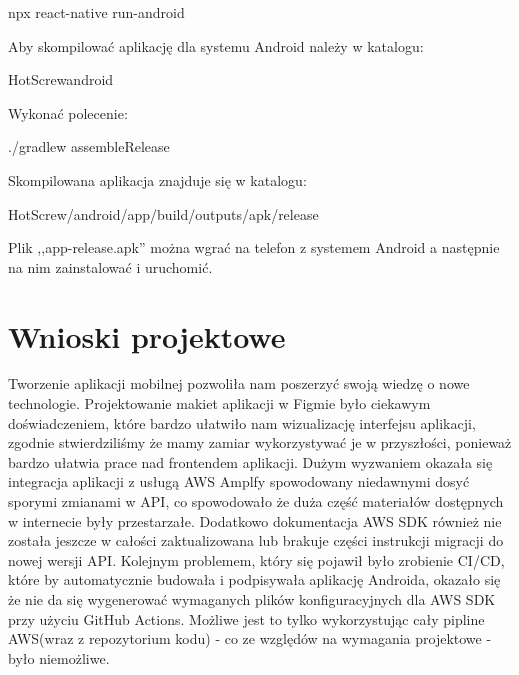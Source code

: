 \documentclass[12pt,a4paper]{article}
\begin{document}
		\begin{tcolorbox}[minipage,colback=white,arc=0pt,outer arc=0pt, fontupper=\footnotesize]
			npx react-native run-android
		\end{tcolorbox}
		Aby skompilować aplikację dla systemu Android należy w katalogu:
		\begin{tcolorbox}[minipage,colback=white,arc=0pt,outer arc=0pt, fontupper=\footnotesize]
			HotScrew\/android
		\end{tcolorbox}
		Wykonać polecenie:
		\begin{tcolorbox}[minipage,colback=white,arc=0pt,outer arc=0pt, fontupper=\footnotesize]
			./gradlew assembleRelease
		\end{tcolorbox}
		Skompilowana aplikacja znajduje się w katalogu:
		\begin{tcolorbox}[minipage,colback=white,arc=0pt,outer arc=0pt, fontupper=\footnotesize]
			HotScrew/android/app/build/outputs/apk/release
		\end{tcolorbox}
		
		Plik ,,app-release.apk'' można wgrać na telefon z systemem Android a następnie na nim zainstalować i uruchomić.
	\newpage
	\section{Wnioski projektowe}
	\indent  Tworzenie aplikacji mobilnej pozwoliła nam poszerzyć swoją wiedzę o nowe technologie. Projektowanie makiet aplikacji w Figmie było ciekawym doświadczeniem,
	które bardzo ułatwiło nam wizualizację interfejsu aplikacji, zgodnie stwierdziliśmy że mamy zamiar wykorzystywać je w przyszłości, ponieważ bardzo ułatwia
	prace nad frontendem aplikacji.	 
	Dużym wyzwaniem okazała się integracja aplikacji z usługą AWS Amplfy spowodowany niedawnymi dosyć sporymi zmianami w API, co spowodowało że duża część materiałów
	dostępnych w internecie były przestarzałe. Dodatkowo dokumentacja AWS SDK również nie została jeszcze w całości zaktualizowana lub brakuje części instrukcji
	migracji do nowej wersji API. Kolejnym problemem, który się pojawił było zrobienie CI/CD, które by automatycznie budowała i podpisywała aplikację Androida,
	okazało się że nie da się wygenerować wymaganych plików konfiguracyjnych dla AWS SDK przy użyciu GitHub Actions. Możliwe jest to tylko wykorzystując cały
	pipline AWS(wraz z repozytorium kodu) -  co ze względów na wymagania projektowe - było niemożliwe.
	
\end{document}
